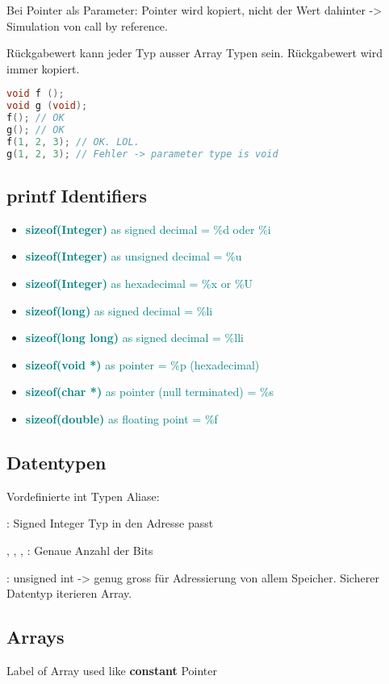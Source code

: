 \begin{multicols*}{4}
Bei Pointer als Parameter: Pointer wird kopiert, nicht der Wert dahinter -> Simulation von call by reference.\vspace{2pt}

Rückgabewert kann jeder Typ ausser Array Typen sein. Rückgabewert wird immer kopiert.

\begin{lstlisting}[language=c]
void f ();
void g (void);
f(); // OK
g(); // OK
f(1, 2, 3); // OK. LOL.
g(1, 2, 3); // Fehler -> parameter type is void
\end{lstlisting}

\subsection{printf Identifiers}
\begin{itemize}
    \item \textcolor{teal}{\textbf{sizeof(Integer)} as signed decimal = \%d oder \%i}
    \item \textcolor{teal}{\textbf{sizeof(Integer)} as unsigned decimal = \%u}
    \item \textcolor{teal}{\textbf{sizeof(Integer)} as hexadecimal = \%x or \%U}
    \item \textcolor{teal}{\textbf{sizeof(long)} as signed decimal = \%li}
    \item \textcolor{teal}{\textbf{sizeof(long long)} as signed decimal = \%lli}
    \item \textcolor{teal}{\textbf{sizeof(void *)} as pointer = \%p (hexadecimal)}
    \item \textcolor{teal}{\textbf{sizeof(char *)} as pointer (null terminated) = \%s}
    \item \textcolor{teal}{\textbf{sizeof(double)} as floating point = \%f}
\end{itemize}

\subsection{Datentypen}
Vordefinierte int Typen Aliase:

: Signed Integer Typ in den Adresse passt

, , , : Genaue Anzahl der Bits

: unsigned int -> genug gross für Adressierung von allem Speicher. Sicherer Datentyp iterieren Array.

\subsection{Arrays}
Label of Array used like \textbf{constant} Pointer


\end{multicols*}
